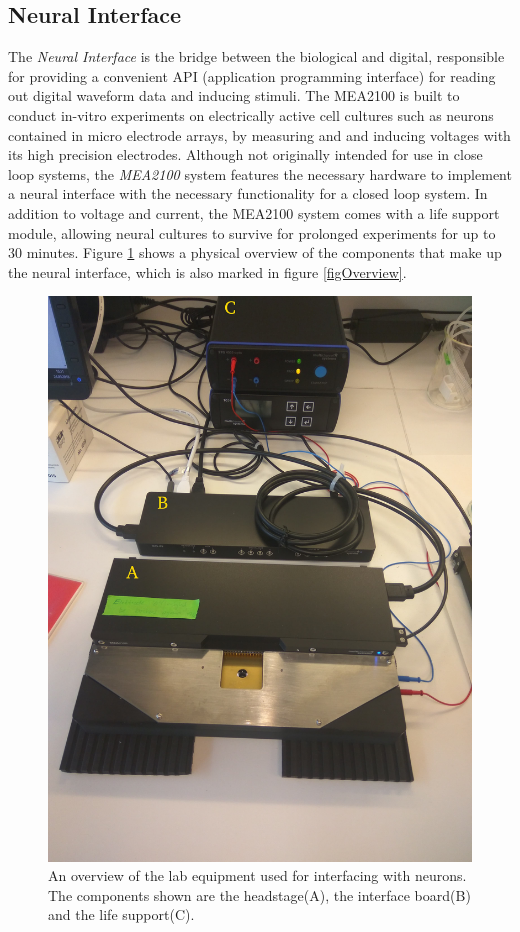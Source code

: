 \subsection{Neural Interface}
The \emph{Neural Interface} is the bridge between the biological and digital,
responsible for providing a convenient API (application programming interface)
for reading out digital waveform data and inducing stimuli.
The MEA2100 is built to conduct in-vitro experiments on electrically active cell
cultures such as neurons contained in micro electrode arrays, by measuring and
and inducing voltages with its high precision electrodes.
Although not originally intended for use in close loop systems, the \textit{MEA2100}
system features the necessary hardware to implement a neural interface with the
necessary functionality for a closed loop system.
In addition to voltage and current, the MEA2100 system comes with a life support
module, allowing neural cultures to survive for prolonged experiments for up to
30 minutes.
Figure \ref{labEquip} shows a physical
overview of the components that make up the neural interface, which is also
marked in figure \ref{figOverview}.
\begin{figure}[h!]
  \centering
  \includegraphics[width=1\textwidth]{fig/LabEquip.jpg}
  \caption[Lab equipment for neural interfacing]{
    An overview of the lab equipment used for interfacing with neurons.
    The components shown are the headstage(A), the interface board(B) and the
    life support(C).
  }
  \label{labEquip}
\end{figure}
